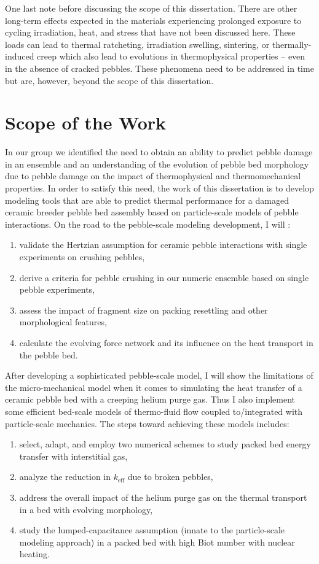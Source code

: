 One last note before discussing the scope of this dissertation. There are other long-term effects expected in the materials experiencing prolonged exposure to cycling irradiation, heat, and stress that have not been discussed here. These loads can lead to thermal ratcheting, irradiation swelling, sintering, or thermally-induced creep which also lead to evolutions in thermophysical properties -- even in the absence of cracked pebbles. These phenomena need to be addressed in time but are, however, beyond the scope of this dissertation. 

 

\section{Scope of the Work}\label{sec:intro-scope-of-work}

In our group we identified the need to obtain an ability to predict pebble damage in an ensemble and an understanding of the evolution of pebble bed morphology due to pebble damage on the impact of thermophysical and thermomechanical properties. In order to satisfy this need, the work of this dissertation is to develop modeling tools that are able to predict thermal performance for a damaged ceramic breeder pebble bed assembly based on particle-scale models of pebble interactions. On the road to the pebble-scale modeling development, I will :
\begin{enumerate}
\item validate the Hertzian assumption for ceramic pebble interactions with single experiments on crushing pebbles,
\item derive a criteria for pebble crushing in our numeric ensemble based on single pebble experiments,
\item assess the impact of fragment size on packing resettling and other morphological features,
\item calculate the evolving force network and its influence on the heat transport in the pebble bed.
\end{enumerate}

After developing a sophisticated pebble-scale model, I will show the limitations of the micro-mechanical model when it comes to simulating the heat transfer of a ceramic pebble bed with a creeping helium purge gas. Thus I also implement some efficient bed-scale models of thermo-fluid flow coupled to/integrated with particle-scale mechanics. The steps toward achieving these models includes:
\begin{enumerate}
\item select, adapt, and employ two numerical schemes to study packed bed energy transfer with interstitial gas,
\item analyze the reduction in $k_\text{eff}$ due to broken pebbles,
\item address the overall impact of the helium purge gas on the thermal transport in a bed with evolving morphology,
\item study the lumped-capacitance assumption (innate to the particle-scale modeling approach) in a packed bed with high Biot number with nuclear heating.
\end{enumerate}

